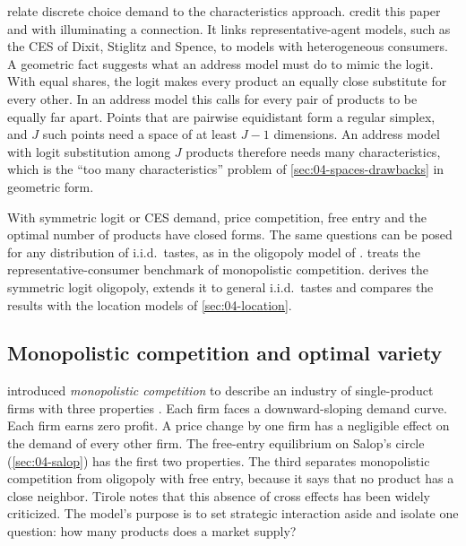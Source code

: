   relate discrete choice demand to the
characteristics approach.  credit this paper and \citet{AndersonDePalmaThisse1988b}
with illuminating a connection. It links representative-agent models, such as the CES of Dixit, Stiglitz and
Spence, to models with heterogeneous consumers. A geometric fact suggests what an address model must do to mimic
the logit. With equal shares, the logit makes every product an equally close substitute for every other. In an
address model this calls for every pair of products to be equally far apart. Points that are pairwise equidistant
form a regular simplex, and $J$ such points need a space of at least $J - 1$ dimensions. An address model with logit
substitution among $J$ products therefore needs many characteristics, which is the ``too many characteristics''
problem of \cref{sec:04-spaces-drawbacks} in geometric form.

 With symmetric logit or CES demand, price competition, free entry and the optimal
number of products have closed forms. The same questions can be posed for any distribution of i.i.d.\ tastes, as
in the oligopoly model of \citet{AndersonDePalmaNesterov1995}.  treats the
representative-consumer benchmark of monopolistic competition.  derives the symmetric logit
oligopoly, extends it to general i.i.d.\ tastes and compares the results with the location models of
\cref{sec:04-location}.

\subsection{Monopolistic competition and optimal variety}\label{sec:04-repcons-monocomp}

\citet{Chamberlin1933} introduced \emph{monopolistic competition} to describe an industry of single-product firms with
three properties \citep[Section 7.2]{Tirole1988}. Each firm faces a downward-sloping demand curve. Each firm earns
zero profit. A price change by one firm has a negligible effect on the demand of every other firm. The free-entry
equilibrium on Salop's circle (\cref{sec:04-salop}) has the first two properties. The third separates monopolistic
competition from oligopoly with free entry, because it says that no product has a close neighbor. Tirole notes that
this absence of cross effects has been widely criticized. The model's purpose is to set strategic interaction aside
and isolate one question: how many products does a market supply?


